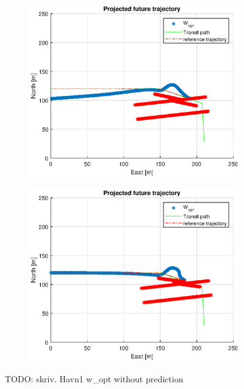 \begin{figure}
\begin{subfigure}[b]{0.499\textwidth}
    \end{subfigure}
    \hfill
    \\
    \begin{subfigure}[b]{0.49\textwidth}
        \centering
        \includegraphics[width=\textwidth]{Images/Figures/Havn1/Simple1_f999_Frame6}
    \end{subfigure}
    \hfill
    \begin{subfigure}[b]{0.499\textwidth}
        \centering
        \includegraphics[width=\textwidth]{Images/Figures/Havn1/Simple1_f999_Frame7}
    \end{subfigure}
    \hfill
    \caption{TODO: skriv. Havn1 w\_opt without prediction}
\end{figure}


